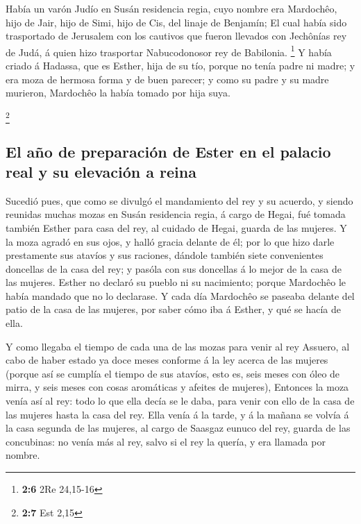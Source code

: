  Había un varón Judío en Susán residencia regia, cuyo nombre
era Mardochêo, hijo de Jair, hijo de Simi, hijo de Cis, del linaje de
Benjamín;  El cual había sido trasportado de Jerusalem con
los cautivos que fueron llevados con Jechônías rey de Judá, á quien hizo
trasportar Nabucodonosor rey de Babilonia. \footnote{\textbf{2:6} 2Re
  24,15-16}  Y había criado á Hadassa, que es Esther, hija
de su tío, porque no tenía padre ni madre; y era moza de hermosa forma y
de buen parecer; y como su padre y su madre murieron, Mardochêo la había
tomado por hija suya.

\footnote{\textbf{2:7} Est 2,15}

\hypertarget{el-auxf1o-de-preparaciuxf3n-de-ester-en-el-palacio-real-y-su-elevaciuxf3n-a-reina}{%
\subsection{El año de preparación de Ester en el palacio real y su
elevación a
reina}\label{el-auxf1o-de-preparaciuxf3n-de-ester-en-el-palacio-real-y-su-elevaciuxf3n-a-reina}}

 Sucedió pues, que como se divulgó el mandamiento del rey y
su acuerdo, y siendo reunidas muchas mozas en Susán residencia regia, á
cargo de Hegai, fué tomada también Esther para casa del rey, al cuidado
de Hegai, guarda de las mujeres.  Y la moza agradó en sus
ojos, y halló gracia delante de él; por lo que hizo darle prestamente
sus atavíos y sus raciones, dándole también siete convenientes doncellas
de la casa del rey; y pasóla con sus doncellas á lo mejor de la casa de
las mujeres.  Esther no declaró su pueblo ni su nacimiento;
porque Mardochêo le había mandado que no lo declarase.  Y
cada día Mardochêo se paseaba delante del patio de la casa de las
mujeres, por saber cómo iba á Esther, y qué se hacía de ella.

 Y como llegaba el tiempo de cada una de las mozas para
venir al rey Assuero, al cabo de haber estado ya doce meses conforme á
la ley acerca de las mujeres (porque así se cumplía el tiempo de sus
atavíos, esto es, seis meses con óleo de mirra, y seis meses con cosas
aromáticas y afeites de mujeres),  Entonces la moza venía
así al rey: todo lo que ella decía se le daba, para venir con ello de la
casa de las mujeres hasta la casa del rey.  Ella venía á la
tarde, y á la mañana se volvía á la casa segunda de las mujeres, al
cargo de Saasgaz eunuco del rey, guarda de las concubinas: no venía más
al rey, salvo si el rey la quería, y era llamada por nombre.

